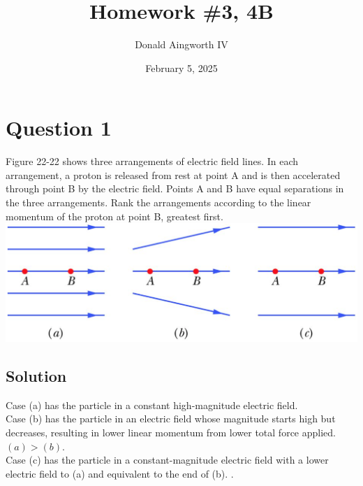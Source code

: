 \documentclass[12pt]{article}
\title{Homework \#3, 4B}
\author{Donald Aingworth IV}
\date{February 5, 2025}
\begin{document}

\maketitle

\pagebreak
\section{Question 1}
Figure 22-22 shows three arrangements of electric field lines. In each arrangement, a proton is released from rest at point A and is then accelerated through point B by the electric field. Points A and B have equal separations in the three arrangements. Rank the arrangements according to the linear momentum of the proton at point B, greatest first.\\
\includegraphics[width=\textwidth]{picture_1.png}

\subsection*{Solution}
Case (a) has the particle in a constant high-magnitude electric field.\\
Case (b) has the particle in an electric field whose magnitude starts high but decreases, resulting in lower linear momentum from lower total force applied. $(a) > (b)$.\\
Case (c) has the particle in a constant-magnitude electric field with a lower electric field to (a) and equivalent to the end of (b). . 

\pagebreak
\end{document}
